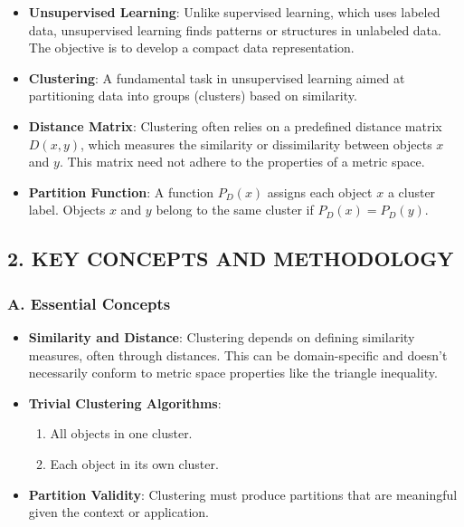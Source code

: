 \documentclass[
  12pt,
]{report}
\providecommand{\tightlist}{%
  \setlength{\itemsep}{0pt}\setlength{\parskip}{0pt}}
\begin{document}
\begin{itemize}
\item
  \textbf{Unsupervised Learning}: Unlike supervised learning, which uses labeled data, unsupervised learning finds patterns or structures in unlabeled data. The objective is to develop a compact data representation.
\item
  \textbf{Clustering}: A fundamental task in unsupervised learning aimed at partitioning data into groups (clusters) based on similarity.
\item
  \textbf{Distance Matrix}: Clustering often relies on a predefined distance matrix \(D(x, y)\), which measures the similarity or dissimilarity between objects \(x\) and \(y\). This matrix need not adhere to the properties of a metric space.
\item
  \textbf{Partition Function}: A function \(P_D(x)\) assigns each object \(x\) a cluster label. Objects \(x\) and \(y\) belong to the same cluster if \(P_D(x) = P_D(y)\).
\end{itemize}

\subsection{2. KEY CONCEPTS AND METHODOLOGY}\label{key-concepts-and-methodology-1}

\subsubsection{A. Essential Concepts}\label{a.-essential-concepts-1}

\begin{itemize}
\item
  \textbf{Similarity and Distance}: Clustering depends on defining similarity measures, often through distances. This can be domain-specific and doesn't necessarily conform to metric space properties like the triangle inequality.
\item
  \textbf{Trivial Clustering Algorithms}:

  \begin{enumerate}
  \def\labelenumi{\arabic{enumi}.}
  \tightlist
  \item
    All objects in one cluster.
  \item
    Each object in its own cluster.
  \end{enumerate}
\item
  \textbf{Partition Validity}: Clustering must produce partitions that are meaningful given the context or application.
\end{itemize}
\end{document}
